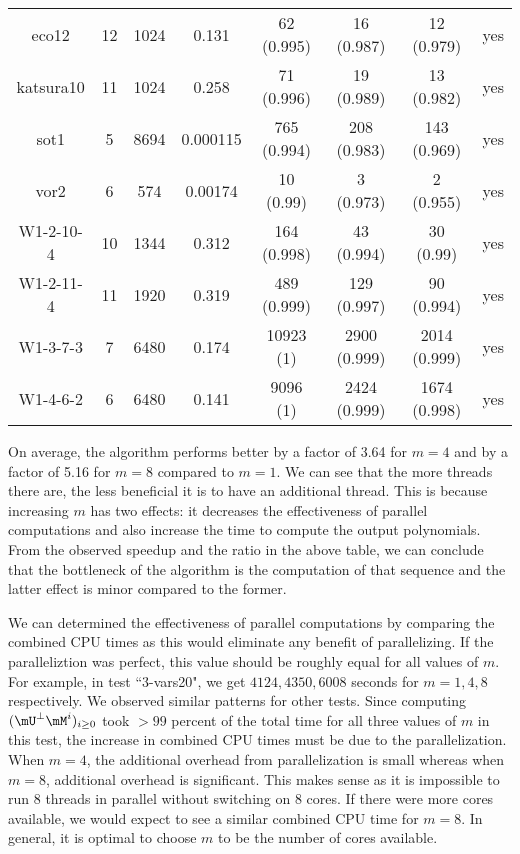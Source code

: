 \documentclass[12pt]{article}
\begin{document}
\begin{center}
\begin{tabular}{c|c|c|c|c|c|c|c}
	eco12&12 &1024&0.131&62 (0.995)&16 (0.987)&12 (0.979)&yes\\
	katsura10&11 &1024&0.258&71 (0.996)&19 (0.989)&13 (0.982)&yes\\
	sot1&5 &8694&0.000115&765 (0.994)&208 (0.983)&143 (0.969)&yes\\
	vor2&6 &574&0.00174&10 (0.99)&3 (0.973)&2 (0.955)&yes\\
	W1-2-10-4&10 &1344&0.312&164 (0.998)&43 (0.994)&30 (0.99)&yes\\
	W1-2-11-4&11 &1920&0.319&489 (0.999)&129 (0.997)&90 (0.994)&yes\\
	W1-3-7-3&7 &6480&0.174&10923 (1)&2900 (0.999)&2014 (0.999)&yes\\
	W1-4-6-2&6 &6480&0.141&9096 (1)&2424 (0.999)&1674 (0.998)&yes\\
\end{tabular}
\end{center}

On average, the algorithm performs better by a factor of 3.64 for
$m=4$ and by a factor of 5.16 for $m=8$ compared to $m=1$. We can
see that the more threads there are, the less beneficial it is
to have an additional thread. This is because
increasing $m$ has two effects: it
decreases the effectiveness of parallel computations and
also increase the time to compute the output polynomials.
From the observed speedup and the ratio in the above table, 
we can conclude that the bottleneck of the
algorithm is the computation of that sequence and
the latter effect is minor compared to the former.

We can determined the effectiveness of parallel computations by comparing
the combined CPU times as this would eliminate any benefit of parallelizing. 
If the paralleliztion was perfect, this value should be roughly equal
for all values of $m$. For example, in test ``3-vars20", we get
$4124, 4350, 6008$ seconds for $m=1,4,8$ respectively. We observed similar
patterns for other tests. Since computing $(\mU^{\perp} \mM^i)_{i\ge0}$ took
$> 99$ percent of the total time for all three values of $m$ in this test,
the increase in combined CPU times must be due to the parallelization.
When $m=4$, the additional overhead from parallelization
is small whereas when $m=8$, additional overhead
is significant. This makes sense as it is impossible
to run 8 threads in parallel without switching on
8 cores. If there were more cores available, we would expect to 
see a similar combined CPU time for $m=8$. In general, it is optimal 
to choose $m$ to be the number of cores available.
\end{document}
